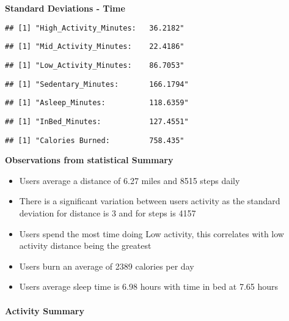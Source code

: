 \documentclass[
]{article}
\providecommand{\tightlist}{%
  \setlength{\itemsep}{0pt}\setlength{\parskip}{0pt}}
\begin{document}
\textbf{Standard Deviations - Time}

\begin{verbatim}
## [1] "High_Activity_Minutes:   36.2182"
\end{verbatim}

\begin{verbatim}
## [1] "Mid_Activity_Minutes:    22.4186"
\end{verbatim}

\begin{verbatim}
## [1] "Low_Activity_Minutes:    86.7053"
\end{verbatim}

\begin{verbatim}
## [1] "Sedentary_Minutes:       166.1794"
\end{verbatim}

\begin{verbatim}
## [1] "Asleep_Minutes:          118.6359"
\end{verbatim}

\begin{verbatim}
## [1] "InBed_Minutes:           127.4551"
\end{verbatim}

\begin{verbatim}
## [1] "Calories Burned:         758.435"
\end{verbatim}

\textbf{Observations from statistical Summary}\\

\begin{itemize}
\tightlist
\item
  Users average a distance of 6.27 miles and 8515 steps daily
\item
  There is a significant variation between users activity as the
  standard deviation for distance is 3 and for steps is 4157
\item
  Users spend the most time doing Low activity, this correlates with low
  activity distance being the greatest
\item
  Users burn an average of 2389 calories per day
\item
  Users average sleep time is 6.98 hours with time in bed at 7.65 hours
\end{itemize}

\paragraph{\texorpdfstring{\textbf{Activity
Summary}}{Activity Summary}}\label{activity-summary}
\end{document}
